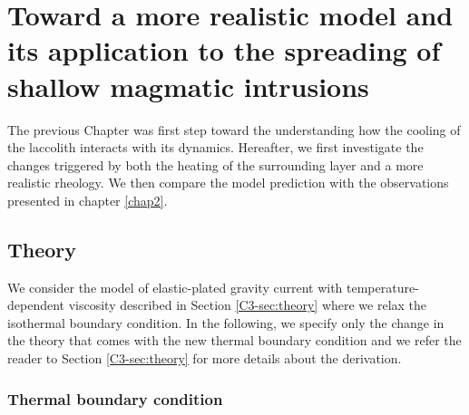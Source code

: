 
\chapter{Toward  a more  realistic model  and its  application to  the
  spreading of shallow magmatic intrusions}
\label{Heating}

\minitoc The previous Chapter was  first step toward the understanding
how  the  cooling  of  the  laccolith  interacts  with  its  dynamics.
Hereafter,  we first  investigate the  changes triggered  by both  the
heating of  the surrounding  layer and a  more realistic  rheology. We
then compare the  model prediction with the  observations presented in
chapter \ref{chap2}.

\section{Theory}
\label{C4-sec:theory-1}

We  consider   the  model  of  elastic-plated   gravity  current  with
temperature-dependent      viscosity     described      in     Section
\ref{C3-sec:theory}   where   we   relax   the   isothermal   boundary
condition. In the following, we specify  only the change in the theory
that comes  with the new thermal  boundary condition and we  refer the
reader  to  Section \ref{C3-sec:theory}  for  more  details about  the
derivation.

\subsection{Thermal boundary condition}
\label{C4-sec:formulation-1}

